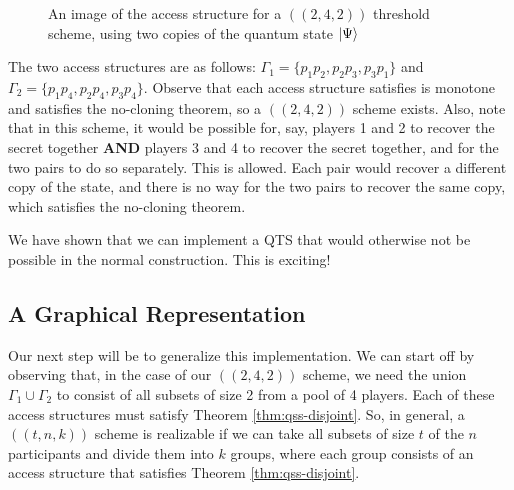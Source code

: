 \begin{figure}[H]
	\begin{center}
	\end{center}
	\caption{An image of the access structure for a $((2,4,2))$ threshold scheme, using two copies of the quantum state $\ket{\Psi}$}
	\label{fig:2-4-2}
\end{figure}

The two access structures are as follows: $\Gamma_1 = \{p_1p_2,p_2p_3,p_3p_1\}$ and $\Gamma_2 = \{p_1p_4,p_2p_4,p_3p_4\}$. Observe that each access structure satisfies is monotone and satisfies the no-cloning theorem, so a $((2,4,2))$ scheme exists. Also, note that in this scheme, it would be possible for, say, players 1 and 2 to recover the secret together \textbf{AND} players 3 and 4 to recover the secret together, and for the two pairs to do so separately. This is allowed. Each pair would recover a different copy of the state, and there is no way for the two pairs to recover the same copy, which satisfies the no-cloning theorem.

We have shown that we can implement a QTS that would otherwise not be possible in the normal construction. This is exciting!

\subsection{A Graphical Representation}
\label{ssec:graphical-rep}

Our next step will be to generalize this implementation. We can start off by observing that, in the case of our $((2,4,2))$ scheme, we need the union $\Gamma_1 \cup \Gamma_2$ to consist of all subsets of size 2 from a pool of 4 players. Each of these access structures must satisfy Theorem \ref{thm:qss-disjoint}. So, in general, a $((t,n,k))$ scheme is realizable if we can take all subsets of size $t$ of the $n$ participants and divide them into $k$ groups, where each group consists of an access structure that satisfies Theorem \ref{thm:qss-disjoint}. 

